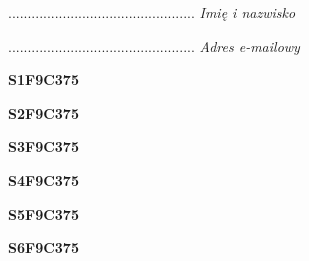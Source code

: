 \begin{turn}{90}\begin{minipage}{\linewidth} \vspace{20mm} ................................................  \textit{Imię i nazwisko}\end{minipage}\end{turn}

\begin{turn}{90}\begin{minipage}{\linewidth} \vspace{20mm} ................................................  \textit{Adres e-mailowy}\end{minipage}\end{turn}

\begin{turn}{90}\huge \begin{minipage}{\linewidth} \vspace{10mm}\textbf{S1F9C375}\end{minipage}\end{turn}

\begin{turn}{90}\huge \begin{minipage}{\linewidth} \vspace{10mm}\textbf{S2F9C375}\end{minipage}\end{turn}

\begin{turn}{90}\huge \begin{minipage}{\linewidth} \vspace{10mm}\textbf{S3F9C375}\end{minipage}\end{turn}

\begin{turn}{90}\huge \begin{minipage}{\linewidth} \vspace{10mm}\textbf{S4F9C375}\end{minipage}\end{turn}

\begin{turn}{90}\huge \begin{minipage}{\linewidth} \vspace{10mm}\textbf{S5F9C375}\end{minipage}\end{turn}

\begin{turn}{90}\huge \begin{minipage}{\linewidth} \vspace{10mm}\textbf{S6F9C375}\end{minipage}\end{turn}


